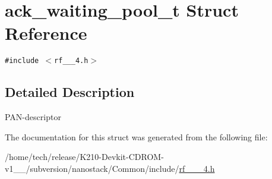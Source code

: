 \hypertarget{structack__waiting__pool__t}{
\section{ack\_\-waiting\_\-pool\_\-t Struct Reference}
\label{structack__waiting__pool__t}
}
{\tt \#include $<$rf\_\_\_\-4.h$>$}



\subsection{Detailed Description}
PAN-descriptor 



The documentation for this struct was generated from the following file:\begin{CompactItemize}
\item 
/home/tech/release/K210-Devkit-CDROM-v1\_\_/subversion/nanostack/Common/include/\hyperlink{rf__802__15__4_8h}{rf\_\_\_\-4.h}\end{CompactItemize}
